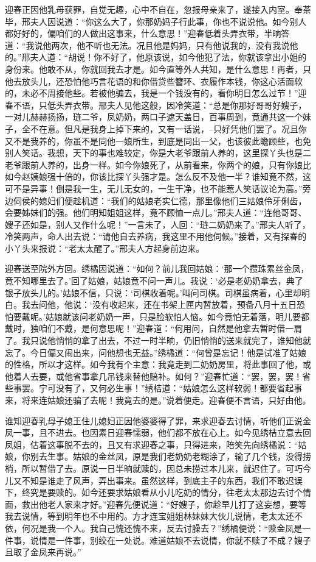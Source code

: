 \documentclass[12pt,oneside]{book}
\begin{document}
迎春正因他乳母获罪，自觉无趣，心中不自在，忽报母亲来了，遂接入内室。奉茶毕，邢夫人因说道：“你这么大了，你那奶妈子行此事，你也不说说他。如今别人都好好的，偏咱们的人做出这事来，什么意思！”迎春低着头弄衣带，半晌答道：“我说他两次，他不听也无法。况且他是妈妈，只有他说我的，没有我说他的。”邢夫人道：“胡说！你不好了，他原该说，如今他犯了法，你就该拿出小姐的身份来。他敢不从，你就回我去才是。如今直等外人共知，是什么意思！再者，只他去放头儿，还恐怕他巧言花语的和你借贷些簪环、衣履作本钱，你这心活面软的，未必不周接他些。若被他骗去，我是一个钱没有的，看你明日怎么过节！”迎春不语，只低头弄衣带。邢夫人见他这般，因冷笑道：“总是你那好哥哥好嫂子，一对儿赫赫扬扬，琏二爷，凤奶奶，两口子遮天盖日，百事周到，竟通共这一个妹子，全不在意。但凡是我身上掉下来的，又有一话说，--只好凭他们罢了。况且你又不是我养的，你虽不是同他一娘所生，到底是同出一父，也该彼此瞻顾些，也免别人笑话。我想，天下的事也难较定，你是大老爷跟前人养的，这里探丫头也是二老爷跟前人养的，出身一样。如今你娘死了，从前看来，你两个的娘，只有你娘比如今赵姨娘强十倍的，你该比探丫头强才是。怎么反不及他一半？谁知竟不然，这可不是异事！倒是我一生，无儿无女的，一生干净，也不能惹人笑话议论为高。”旁边伺侯的媳妇们便趁机道：“我们的姑娘老实仁德，那里像他们三姑娘伶牙俐齿，会要姊妹们的强。他们明知姐姐这样，竟不顾恤一点儿。”邢夫人道：“连他哥哥、嫂子还如是，别人又作什么呢！”一言未了，人回：“琏二奶奶来了。”邢夫人听了，冷笑两声，命人出去说：“请他自去养病，我这里不用他伺候。”接着，又有探春的小丫头来报说：“老太太醒了。”邢夫人方起身前边来。

迎春送至院外方回。绣橘因说道：“如何？前儿我回姑娘：‘那一个攒珠累丝金凤，竟不知哪里去了。’回了姑娘，姑娘竟不问一声儿。我说：‘必是老奶奶拿去，典了银子放头儿的。’姑娘不信，只说：‘司棋收着呢。’叫问司棋。司棋虽病着，心里却明白。我去问他，他说：‘没有收起来，还在书架上匣内暂放着，预备八月十五日恐怕要戴呢。’姑娘就该问老奶奶一声，只是脸软怕人恼。如今竟怕无着落，明儿要都戴时，独咱们不戴，是何意思呢！”迎春道：“何用问，自然是他拿去暂时借一肩了。我只说他悄悄的拿了出去，不过一时半晌，仍旧悄悄的送来就完了，谁知他就忘了。今日偏又闹出来，问他想也无益。”绣橘道：“何曾是忘记！他是试准了姑娘的性格，所以才这样。如今我有个主意：我竟走到二奶奶房里，将此事回了他，或他着人去要，或他省事拿几吊钱来替他赔补。如何？”迎春忙道：“罢，罢，罢！省些事罢。宁可没有了，又何必生事！”绣桔道：“姑娘怎么这样软弱！都要省起事来，将来连姑娘还骗了去呢！我竟去的是。”说着便走。迎春便不言语，只好由他。

谁知迎春乳母子媳王住儿媳妇正因他婆婆得了罪，来求迎春去讨情，听他们正说金凤一事，且不进去。也因素日迎春懦弱，他们都不放在心上。如今见绣桔立意去回凤姐，估着这事脱不去的，且又有求迎春之事，只得进来，陪笑先向绣橘说：“姑娘，你别去生事。姑娘的金丝凤，原是我们老奶奶老糊涂了，输了几个钱，没得捞梢，所以暂借了去。原说一日半晌就赎的，因总未捞过本儿来，就迟住了。可巧今儿又不知是谁走了风声，弄出事来。虽然这样，到底主子的东西，我们不敢迟误下，终究是要赎的。如今还要求姑娘看从小儿吃奶的情分，往老太太那边去讨个情面，救出他老人家来才好。”迎春先便说道：“好嫂子，你趁早儿打了这妄想，要等我去说情，等到明年也不中用的。方才连宝姐姐林妹妹大伙儿说情，老太太还不依，何况是我一个人。我自己愧还愧不来，反去讨臊去？”绣橘便说：“赎金凤是一件事，说情是一件事，别绞在一处说。难道姑娘不去说情，你就不赎了不成？嫂子且取了金凤来再说。”
\end{document}
